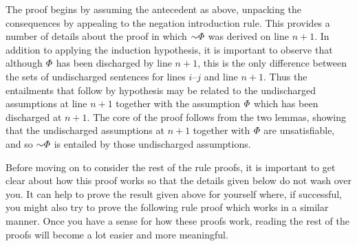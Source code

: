 The proof begins by assuming the antecedent as above, unpacking the consequences by appealing to the negation introduction rule.
This provides a number of details about the proof in which $\enot\metaA$ was derived on line $n+1$.
In addition to applying the induction hypothesis, it is important to observe that although $\varPhi$ has been discharged by line $n+1$, this is the only difference between the sets of undischarged sentences for lines $i$--$j$ and line $n+1$.
Thus the entailments that follow by hypothesis may be related to the undischarged assumptions at line $n+1$ together with the assumption $\varPhi$ which has been discharged at $n+1$.
The core of the proof follows from the two lemmas, showing that the undischarged assumptions at $n+1$ together with $\varPhi$ are unsatisfiable, and so $\enot\metaA$ is entailed by those undischarged assumptions. 

Before moving on to consider the rest of the rule proofs, it is important to get clear about how this proof works so that the details given below do not wash over you.
It can help to prove the result given above for yourself where, if successful, you might also try to prove the following rule proof which works in a similar manner.
Once you have a sense for how these proofs work, reading the rest of the proofs will become a lot easier and more meaningful.





